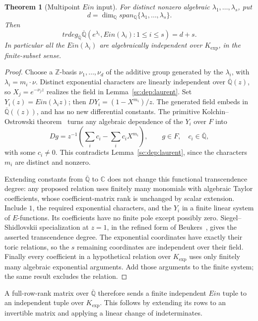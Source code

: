 \documentclass[11pt,a4paper]{article}
\newtheorem{theorem}{Theorem}[section]
\theoremstyle{definition}
\theoremstyle{remark}
\theoremstyle{plain}
\numberwithin{equation}{section}
\def\operatorname#1{#1}\def\mathrm#1{#1}}
\begin{document}
\begin{theorem}[Multipoint $\operatorname{Ein}$ input]
\label{sc:dep:multipoint}
For distinct nonzero algebraic $\lambda_1,\ldots,\lambda_s$, put
\[d=\dim_{\mathbb Q}\operatorname{span}_{\mathbb Q}
\{\lambda_1,\ldots,\lambda_s\}.\]
Then
\[
 \operatorname{trdeg}_{\overline{\mathbb Q}}
 \overline{\mathbb Q}(e^{\lambda_i},\operatorname{Ein}(\lambda_i):
                      1\le i\le s)=d+s.
\]
In particular all the $\operatorname{Ein}(\lambda_i)$ are algebraically
independent over $K_{\exp}$, in the finite-subset sense.
\end{theorem}
\begin{proof}
Choose a $\mathbb Z$-basis $\nu_1,\ldots,\nu_d$ of the additive group
generated by the $\lambda_i$, with $\lambda_i=m_i\cdot\nu$.
Distinct exponential characters are linearly independent over
$\overline{\mathbb Q}(z)$, so $X_j=e^{-\nu_jz}$ realizes the field in
Lemma~\ref{sc:dep:laurent}. Set $Y_i(z)=\operatorname{Ein}(\lambda_i z)$;
then $DY_i=(1-X^{m_i})/z$. The generated field embeds in
$\overline{\mathbb Q}((z))$, and has no new differential constants.
The primitive Kolchin--Ostrowski theorem~\cite{Kolchin} turns any
algebraic dependence of the $Y_i$ over $F$ into
\[
 Dg=z^{-1}\left(\sum_i c_i-\sum_i c_iX^{m_i}\right),
 \qquad g\in F,\quad c_i\in\overline{\mathbb Q},
\]
with some $c_i\ne0$. This contradicts Lemma~\ref{sc:dep:laurent}, since
the characters $m_i$ are distinct and nonzero.

Extending constants from $\overline{\mathbb Q}$ to $\mathbb C$ does
not change this functional transcendence degree: any proposed relation
uses finitely many monomials with algebraic Taylor coefficients, whose
coefficient-matrix rank is unchanged by scalar extension. Include $1$,
the required exponential characters, and the $Y_i$ in a finite linear
system of $E$-functions. Its coefficients have no finite pole except
possibly zero. Siegel--Shidlovskii specialization at $z=1$, in the refined
form of Beukers~\cite{Beukers}, gives the asserted transcendence
degree. The exponential coordinates have exactly their toric relations,
so the $s$ remaining coordinates are independent over their field.
Finally every coefficient in a hypothetical relation over $K_{\exp}$
uses only finitely many algebraic exponential arguments. Add those
arguments to the finite system; the same result excludes the relation.
\end{proof}

A full-row-rank matrix over $\overline{\mathbb Q}$ therefore sends a
finite independent $\operatorname{Ein}$ tuple to an independent tuple
over $K_{\exp}$. This follows by extending its rows to an invertible
matrix and applying a linear change of indeterminates.
\end{document}
